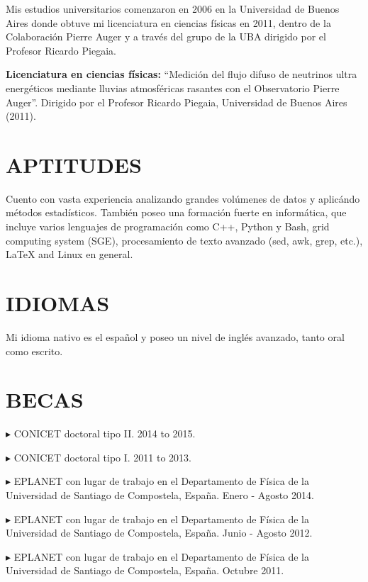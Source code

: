 \documentclass[letterpaper]{article}
\renewenvironment{itemize}{
  \begin{list}{}{
    \setlength{\leftmargin}{1.5em}
  }
}{
  \end{list}
}
\begin{document}
Mis estudios universitarios comenzaron en 2006 en la Universidad de Buenos Aires donde obtuve mi licenciatura en ciencias físicas en 2011, dentro de la Colaboración Pierre Auger y a través del grupo de la UBA dirigido por el Profesor Ricardo Piegaia.

\begin{itemize}
 \item \textbf{Licenciatura en ciencias físicas:} ``Medición del flujo difuso de neutrinos ultra energéticos mediante lluvias atmosféricas rasantes con el Observatorio Pierre Auger''.
 Dirigido por el Profesor Ricardo Piegaia, Universidad de Buenos Aires (2011).
\end{itemize}
 
\section*{APTITUDES}


Cuento con vasta experiencia analizando grandes volúmenes de datos y aplicándo métodos estadísticos. También poseo una formación fuerte en informática, que incluye varios lenguajes de programación como C++, Python y Bash, grid computing system (SGE), procesamiento de texto avanzado (sed, awk, grep, etc.), \LaTeX{} and Linux en general.


\section*{IDIOMAS}

Mi idioma nativo es el español y poseo un nivel de inglés avanzado, tanto oral como escrito.


\section*{BECAS} 
   \begin{itemize} %
   \item $\blacktriangleright$ CONICET doctoral tipo II. 2014 to 2015. 
   \item $\blacktriangleright$ CONICET doctoral tipo I. 2011 to 2013. 
   \item $\blacktriangleright$ EPLANET con lugar de trabajo en el Departamento de Física de la Universidad de Santiago de Compostela, España. Enero - Agosto 2014.
   \item $\blacktriangleright$ EPLANET con lugar de trabajo en el Departamento de Física de la Universidad de Santiago de Compostela, España. Junio - Agosto 2012.
   \item $\blacktriangleright$ EPLANET con lugar de trabajo en el Departamento de Física de la Universidad de Santiago de Compostela, España. Octubre 2011.
 \end{itemize}
\end{document}
